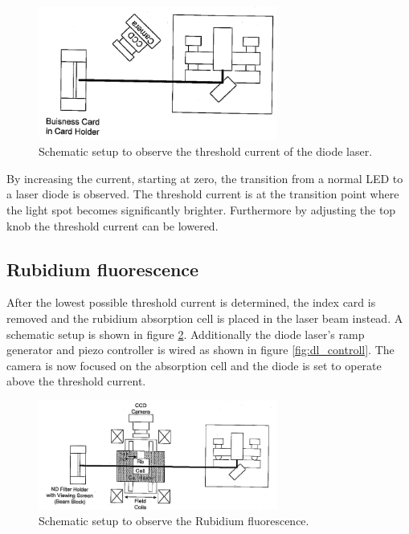 \begin{figure}
  \centering
  \includegraphics[width=0.7\textwidth]{setup1.png}
  \caption{Schematic setup to observe the threshold current of the diode laser.\cite{V61}}
  \label{fig:setup1}
\end{figure}
By increasing the current, starting at zero, the transition from
a normal LED to a laser diode is observed.
The threshold current is at the
transition point where the light spot becomes significantly brighter.
Furthermore by adjusting the top knob the threshold current can be lowered.


\subsection{Rubidium fluorescence}
\label{subsec:RB_fluorescence}

After the lowest possible threshold current is determined, the
index card is removed and
the rubidium absorption cell
is placed in the laser beam instead.
A schematic setup is shown in figure \ref{fig:setup2}.
Additionally the diode laser's ramp generator and  piezo controller is wired as shown in figure \ref{fig:dl_controll}.
The camera is now
focused on the absorption cell and
the diode is set to operate above the threshold current.
\begin{figure}
  \centering
  \includegraphics[width=0.7\textwidth]{setup2.png}
  \caption{Schematic setup to observe the Rubidium fluorescence.\cite{V61}}
  \label{fig:setup2}
\end{figure}


